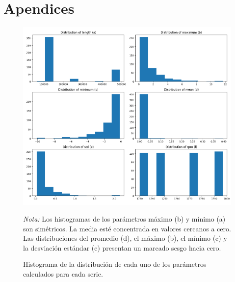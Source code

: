 \documentclass[11pt,a4paper,spanish]{book}
\numberwithin{equation}{chapter}
\numberwithin{figure}{chapter}
\begin{document}

\newpage





\newpage


\appendix
\chapter{Apendices}

\begin{figure}[H]
    \caption{Histograma de la distribución de cada uno de los parámetros calculados para cada serie. }
    \centering
    \includegraphics[width=1\textwidth]{media/dataset/histogram-01.png}
    \label{fig:figHistogram01}
    \parbox{\textwidth}{\footnotesize \textit{Nota:} 
    Los histogramas de los parámetros máximo (b) y mínimo (a) son simétricos. 
    La media esté concentrada en valores cercanos a cero.
    Las distribuciones del promedio (d), el máximo (b), el mínimo (c) y la desviación 
	estándar (e) presentan un marcado sesgo hacia cero.}

\end{figure}

\newpage
\end{document}
